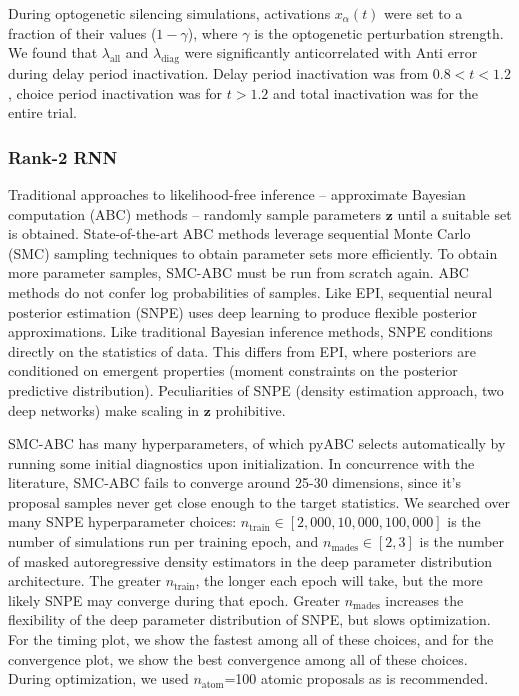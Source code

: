 \documentclass[11pt]{article}
\begin{document}
During optogenetic silencing simulations, activations $x_\alpha(t)$ were set to a fraction of their values ($1 - \gamma$), where $\gamma$ is the optogenetic perturbation strength.
We found that $\lambda_{\text{all}}$ and $\lambda_{\text{diag}}$ were significantly anticorrelated with Anti error during delay period inactivation.
Delay period inactivation was from $0.8 < t < 1.2$, choice period inactivation was for $t > 1.2$ and total inactivation was for the entire trial.

\subsubsection{Rank-2 RNN}\label{methods_RNN}
Traditional approaches to likelihood-free inference -- approximate Bayesian computation (ABC) methods -- randomly sample parameters $\mathbf{z}$ until a suitable set is obtained.
State-of-the-art ABC methods leverage sequential Monte Carlo (SMC) sampling techniques to obtain parameter sets more efficiently.
To obtain more parameter samples, SMC-ABC must be run from scratch again.
ABC methods do not confer log probabilities of samples.
 Like EPI, sequential neural posterior estimation (SNPE) uses deep learning to produce flexible posterior approximations.
Like traditional Bayesian inference methods, SNPE conditions directly on the statistics of data.
This differs from EPI, where posteriors are conditioned on emergent properties (moment constraints on the posterior predictive distribution).
Peculiarities of SNPE (density estimation approach, two deep networks) make scaling in $\mathbf{z}$ prohibitive.

SMC-ABC has many hyperparameters, of which pyABC selects automatically by running some initial diagnostics upon initialization.
In concurrence with the literature, SMC-ABC fails to converge around 25-30 dimensions, since it's proposal samples never get close enough to the target statistics.
We searched over many SNPE hyperparameter choices: $n_{\text{train}} \in [2,000, 10,000, 100,000]$ is the number of simulations run per training epoch, and $n_{\text{mades}} \in [2, 3]$ is the number of masked autoregressive density estimators in the deep parameter distribution architecture.  
The greater $n_{\text{train}}$, the longer each epoch will take, but the more likely SNPE may converge during that epoch.
Greater $n_{\text{mades}}$ increases the flexibility of the deep parameter distribution of SNPE, but slows optimization.
For the timing plot, we show the fastest among all of these choices, and for the convergence plot, we show the best convergence among all of these choices.
During optimization, we used $n_{\text{atom}}$=100 atomic proposals as is recommended.
\end{document}
